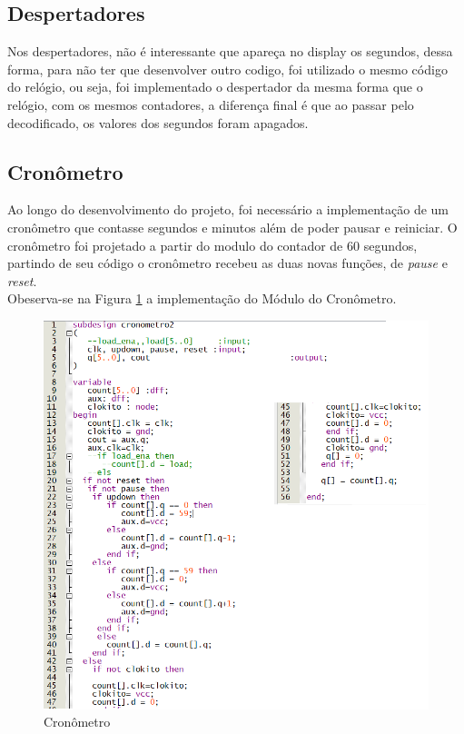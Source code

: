 \documentclass[14pt, oneside]{book}
\newcommand\tab[1][1cm]{\hspace*{#1}}
\theoremstyle{definition}
\begin{document}
                \subsection{Despertadores}
                \tab Nos despertadores, não é interessante que apareça no display os segundos, dessa forma, para não ter que desenvolver outro codigo, foi utilizado o mesmo código do relógio, ou seja, foi implementado o despertador da mesma forma que o relógio, com os mesmos contadores, a diferença final é que ao passar pelo decodificado, os valores dos segundos foram apagados.
                \subsection{Cronômetro}
                \tab  Ao longo do desenvolvimento do projeto, foi necessário a implementação de um cronômetro que contasse segundos e minutos além de poder pausar e reiniciar. O cronômetro foi projetado a partir do modulo do contador de 60 segundos, partindo de seu código o cronômetro recebeu as duas novas funções, de \textit{pause} e \textit{reset}.\\
                
                \tab Obeserva-se na Figura \ref{fig:cronometro} a implementação do Módulo do Cronômetro.
                
                    \begin{figure}[H]
                    \centering
                    \includegraphics[scale=0.8]{cronometro2.png}
                    \caption{Cronômetro}
                    \label{fig:cronometro}
                \end{figure}
                
\end{document}
